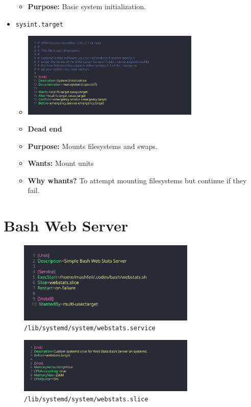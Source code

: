 \documentclass{article}
\newcommand{\code}[1]{\colorbox{light-gray}{\texttt{#1}}}
\begin{document}
\begin{itemize}
\begin{itemize}
		      \item \textbf{Purpose:} Basic system initialization.
	      \end{itemize}
	\item \code{sysint.target}
	      \begin{itemize}
		      \item \includegraphics[width=240pt]{7_4.png}
		      \item \textbf{Dead end}
		      \item \textbf{Purpose:} Mounts filesystems and swaps.
		      \item \textbf{Wants:} Mount units
		      \item \textbf{Why whants?} To attempt mounting filesystems but continue if they fail.
	      \end{itemize}
\end{itemize}

\section{Bash Web Server}
\noindent

\begin{figure}[H]
	\centering
	\includegraphics[width=240pt]{7_5-1.png}
	\caption{\code{/lib/systemd/system/webstats.service}}
\end{figure}

\begin{figure}[H]
	\centering
	\includegraphics[width=240pt]{7_5-2.png}
	\caption{\code{/lib/systemd/system/webstats.slice}}
\end{figure}
\end{document}
